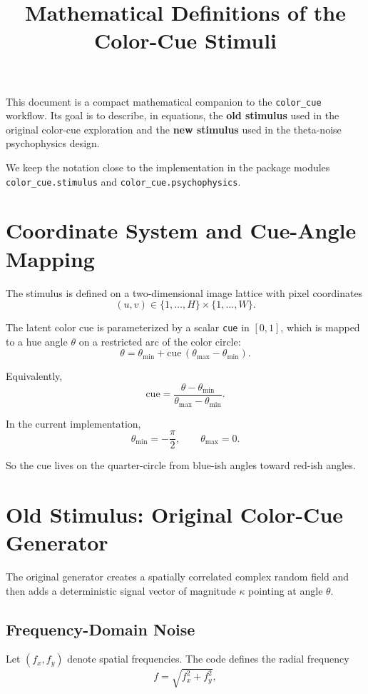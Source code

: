 \documentclass[11pt]{article}
\title{Mathematical Definitions of the Color-Cue Stimuli}
\author{}
\date{}
\begin{document}
\maketitle

This document is a compact mathematical companion to the \texttt{color\_cue}
workflow. Its goal is to describe, in equations, the \textbf{old stimulus}
used in the original color-cue exploration and the \textbf{new stimulus} used
in the theta-noise psychophysics design.

We keep the notation close to the implementation in the package modules
\texttt{color\_cue.stimulus} and \texttt{color\_cue.psychophysics}.

\section{Coordinate System and Cue-Angle Mapping}

The stimulus is defined on a two-dimensional image lattice with pixel
coordinates
\[
(u, v) \in \{1, \dots, H\} \times \{1, \dots, W\}.
\]

The latent color cue is parameterized by a scalar \texttt{cue} in $[0,1]$,
which is mapped to a hue angle $\theta$ on a restricted arc of the color
circle:
\[
\theta = \theta_{\min} + \text{cue}\,(\theta_{\max} - \theta_{\min}).
\]

Equivalently,
\[
\text{cue} = \frac{\theta - \theta_{\min}}{\theta_{\max} - \theta_{\min}}.
\]

In the current implementation,
\[
\theta_{\min} = -\frac{\pi}{2},
\qquad
\theta_{\max} = 0.
\]

So the cue lives on the quarter-circle from blue-ish angles toward red-ish
angles.

\section{Old Stimulus: Original Color-Cue Generator}

The original generator creates a spatially correlated complex random field and
then adds a deterministic signal vector of magnitude $\kappa$ pointing at angle
$\theta$.

\subsection{Frequency-Domain Noise}

Let $(f_x, f_y)$ denote spatial frequencies. The code defines the radial
frequency
\[
f = \sqrt{f_x^2 + f_y^2},
\]
\end{document}
